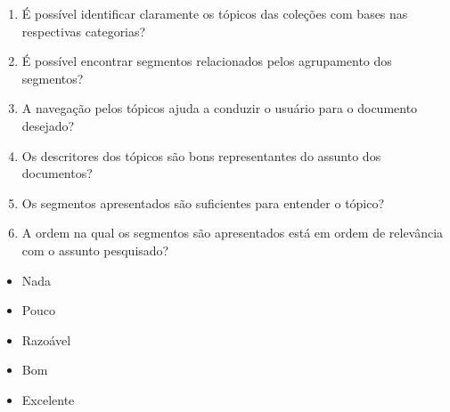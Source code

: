 \documentclass{article}
\begin{document}
\begin{enumerate}
\item É possível identificar claramente os tópicos das coleções com bases nas respectivas
categorias?

\item É possível encontrar segmentos relacionados pelos agrupamento dos segmentos? 

\item A navegação pelos tópicos ajuda a conduzir o usuário para o documento desejado?

\item Os descritores dos tópicos são bons representantes do assunto dos documentos?

\item Os segmentos apresentados são suficientes para entender o tópico?

\item A ordem na qual os segmentos são apresentados está em ordem de relevância com o assunto pesquisado?

\end{enumerate}





\begin{multicols}{5}

\begin{itemize}
\item Nada
\item Pouco
\item Razoável
\item Bom
\item Excelente
\end{itemize}


\end{multicols}
\end{document}
